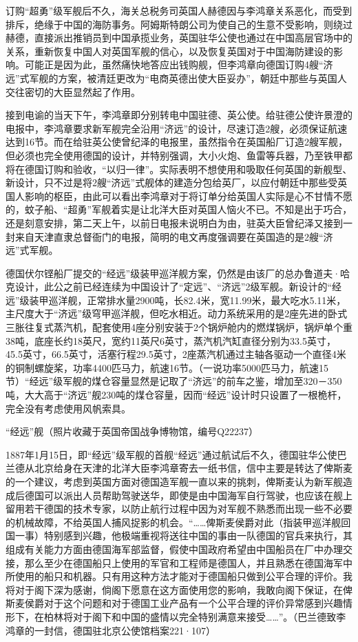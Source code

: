 \documentclass[12pt,UTF8]{ctexbook}
\begin{document}
订购“超勇”级军舰后不久，海关总税务司英国人赫德因与李鸿章关系恶化，而受到排斥，绝缘于中国的海防事务。阿姆斯特朗公司为使自己的生意不受影响，则绕过赫德，直接派出推销员到中国承揽业务，英国驻华公使也通过在中国高层官场中的关系，重新恢复中国人对英国军舰的信心，以及恢复英国对于中国海防建设的影响。可能正是因为此，虽然痛快地答应出钱购舰，但李鸿章向德国订购4艘“济远”式军舰的方案，被清廷更改为“电商英德出使大臣妥办”，朝廷中那些与英国人交往密切的大臣显然起了作用。

接到电谕的当天下午，李鸿章即分别转电中国驻德、英公使。给驻德公使许景澄的电报中，李鸿章要求新军舰完全沿用“济远”的设计，尽速订造2艘，必须保证航速达到16节。而在给驻英公使曾纪泽的电报里，虽然指令在英国船厂订造2艘军舰，但必须也完全使用德国的设计，并特别强调，大小火炮、鱼雷等兵器，乃至铁甲都将在德国订购和验收，“以归一律”。实际表明不想使用和吸取任何英国的新舰型、新设计，只不过是将2艘“济远”式舰体的建造分包给英厂，以应付朝廷中那些受英国人影响的枢臣，由此可以看出李鸿章对于将订单分给英国人实际是心不甘情不愿的，蚊子船、“超勇”军舰着实是让北洋大臣对英国人恼火不已。不知是出于巧合，还是刻意安排，第二天上午，以前日电报未说明白为由，驻英大臣曾纪泽又接到一封来自天津直隶总督衙门的电报，简明的电文再度强调要在英国造的是2艘“济远”式军舰。

德国伏尔铿船厂提交的“经远”级装甲巡洋舰方案，仍然是由该厂的总办鲁道夫·哈克设计，此公之前已经连续为中国设计了“定远”、“济远”2级军舰。新设计的“经远”级装甲巡洋舰，正常排水量2900吨，长82.4米，宽11.99米，最大吃水5.11米，主尺度大于“济远”级穹甲巡洋舰，但吃水相近。动力系统采用的是2座先进的卧式三胀往复式蒸汽机，配套使用4座分别安装于2个锅炉舱内的燃煤锅炉，锅炉单个重38吨，底座长约18英尺，宽约11英尺6英寸，蒸汽机汽缸直径分别为33.5英寸，45.5英寸，66.5英寸，活塞行程29.5英寸，2座蒸汽机通过主轴各驱动一个直径4米的铜制螺旋桨，功率4400匹马力，航速16节。（一说功率5000匹马力，航速15节）“经远”级军舰的煤仓容量显然是记取了“济远”的前车之鉴，增加至320－350吨，大大高于“济远”舰230吨的煤仓容量，因而“经远”设计时只设置了一根桅杆，完全没有考虑使用风帆索具。

“经远”舰（照片收藏于英国帝国战争博物馆，编号Q22237）

1887年1月15日，即“经远”级军舰的首舰“经远”通过航试后不久，德国驻华公使巴兰德从北京给身在天津的北洋大臣李鸿章寄去一纸书信，信中主要是转达了俾斯麦的一个建议，考虑到英国方面对德国造军舰一直以来的挑刺，俾斯麦认为新军舰造成后德国可以派出人员帮助驾驶送华，即使是由中国海军自行驾驶，也应该在舰上留用若干德国的技术专家，以防止航行过程中因为对军舰不熟悉而出现一些不必要的机械故障，不给英国人捕风捉影的机会。“……俾斯麦侯爵对此（指装甲巡洋舰回国一事）特别感到兴趣，他极端重视将送往中国的事由一队德国的官兵来执行，其组成有关能力方面由德国海军部监督，假使中国政府希望由中国船员在厂中办理交接，那么至少在德国船只上使用的军官和工程师是德国人，并且熟悉在德国海军中所使用的船只和机器。只有用这种方法才能对于德国船只做到公平合理的评价。我将对于阁下深为感谢，倘阁下愿意在这方面使用您的影响，我敢向阁下保证，在俾斯麦侯爵对于这个问题和对于德国工业产品有一个公平合理的评价异常感到兴趣情形下，在柏林将对于阁下和中国的盛情以完全特别满意来接受……”。（巴兰德致李鸿章的一封信，德国驻北京公使馆档案221·107）
\end{document}
